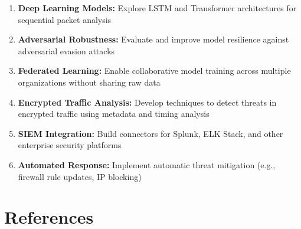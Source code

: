 \documentclass[12pt,a4paper]{article}
\begin{document}
\begin{enumerate}
    \item \textbf{Deep Learning Models:} Explore LSTM and Transformer architectures for sequential packet analysis
    
    \item \textbf{Adversarial Robustness:} Evaluate and improve model resilience against adversarial evasion attacks
    
    \item \textbf{Federated Learning:} Enable collaborative model training across multiple organizations without sharing raw data
    
    \item \textbf{Encrypted Traffic Analysis:} Develop techniques to detect threats in encrypted traffic using metadata and timing analysis
    
    \item \textbf{SIEM Integration:} Build connectors for Splunk, ELK Stack, and other enterprise security platforms
    
    \item \textbf{Automated Response:} Implement automatic threat mitigation (e.g., firewall rule updates, IP blocking)
\end{enumerate}

\section{References}
\end{document}
